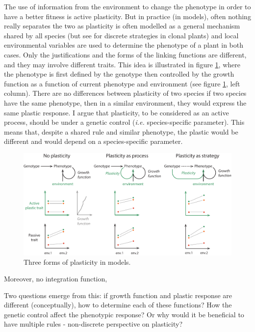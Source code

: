 {The use of information from the environment to change the phenotype in order to have a better fitness is active plasticity. But in practice (in models)\parencite{maire_plasticity_2013}, often nothing really separates the two as plasticity is often modelled as a general mechanism shared by all species (but see \cite{jablonka_adaptive_1995} for discrete strategies in clonal plants) and local environmental variables are used to determine the phenotype of a plant in both cases. Only the justifications and the forms of the linking functions are different, and they may involve different traits. This idea is illustrated in figure \ref{fig:plastic_function}, where the phenotype is first defined by the genotype then controlled by the growth function as a function of current phenotype and environment (see figure \ref{fig:plastic_function}, left column). There are no differences between plasticity of two species if two species have the same phenotype, then in a similar environment, they would express the same plastic response. I argue that plasticity, to be considered as an active process, should be under a genetic control (\textit{i.e.} species-specific parameter). This means that, despite a shared rule and similar phenotype, the plastic would be different and would depend on a species-specific parameter.


\begin{figure}
    \includegraphics[width=1\linewidth]{./1_Introduction/graphics/plastic_function.pdf}
  \caption[Forms of plasticity in models]{Three forms of plasticity in models. }
  \label{fig:plastic_function}
\end{figure}

Moreover, no integration function, 

Two questions emerge from this: if growth function and plastic response are different (conceptually), how to determine each of these functions?
How the genetic control affect the phenotypic response? Or why would it be beneficial to have multiple rules - non-discrete perspective on plasticity?

}
